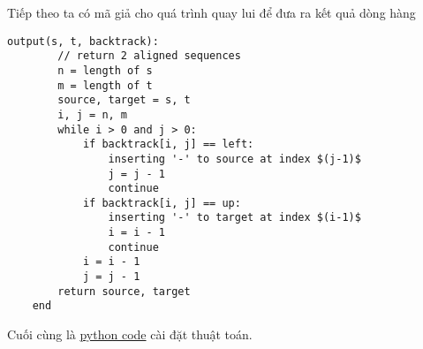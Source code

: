 Tiếp theo ta có mã giả cho quá trình quay lui để đưa ra kết quả dòng hàng
\begin{lstlisting}[style=algo]
    output(s, t, backtrack):
        // return 2 aligned sequences
        n = length of s
        m = length of t
        source, target = s, t
        i, j = n, m
        while i > 0 and j > 0:
            if backtrack[i, j] == left:
                inserting '-' to source at index $(j-1)$
                j = j - 1
                continue
            if backtrack[i, j] == up:
                inserting '-' to target at index $(i-1)$
                i = i - 1
                continue
            i = i - 1
            j = j - 1
        return source, target
    end
\end{lstlisting}

Cuối cùng là \href{https://github.com/batman0911/dma_homework/blob/master/hw_01/src/sequence.ipynb}{python code} 
cài đặt thuật toán.